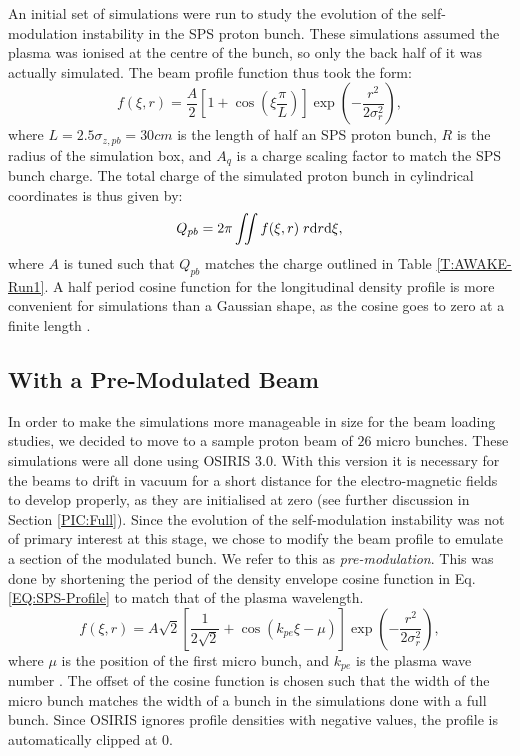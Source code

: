 An initial set of simulations were run to study the evolution of the self-modulation instability in the SPS proton bunch.
These simulations assumed the plasma was ionised at the centre of the bunch, so only the back half of it was actually simulated.
The beam profile function thus took the form:
\begin{equation}
    f(\xi,r) = \frac{A}{2} \left[1 + \cos\left(\xi\frac{\pi}{L}\right)\right] \exp\left(-\frac{r^{2}}{2\sigma_{r}^{2}}\right), \label{EQ:SPS-Profile}
\end{equation}
where $L = 2.5\sigma_{z,pb} = 30\unit{cm}$ is the length of half an SPS proton bunch, $R$ is the radius of the simulation box, and $A_{q}$ is a charge scaling factor to match the SPS bunch charge.
The total charge of the simulated proton bunch in cylindrical coordinates is thus given by:
\begin{equation}
    Q_{pb} = 2\pi \iint f(\xi,r) \;r \mathrm{d} r \mathrm{d} \xi, \label{EQ:SPS-Charge}
\end{equation}
where $A$ is tuned such that $Q_{pb}$ matches the charge outlined in Table \ref{T:AWAKE-Run1}.
A half period cosine function for the longitudinal density profile is more convenient for simulations than a Gaussian shape, as the cosine goes to zero at a finite length \cite{lotov:2010}.


\subsection{With a Pre-Modulated Beam}
\label{Sim:PBPreMod}

In order to make the simulations more manageable in size for the beam loading studies, we decided to move to a sample proton beam of $26$ micro bunches.
These simulations were all done using OSIRIS 3.0.
With this version it is necessary for the beams to drift in vacuum for a short distance for the electro-magnetic fields to develop properly, as they are initialised at zero (see further discussion in Section \ref{PIC:Full}).
Since the evolution of the self-modulation instability was not of primary interest at this stage, we chose to modify the beam profile to emulate a section of the modulated bunch.
We refer to this as \textit{pre-modulation}.
This was done by shortening the period of the density envelope cosine function in Eq. \ref{EQ:SPS-Profile} to match that of the plasma wavelength.
\begin{equation}
    f(\xi,r) = A\sqrt{2} \left[\frac{1}{2\sqrt{2}}
             + \cos\left(k_{pe}\xi - \mu\right)\right] \exp\left(-\frac{r^{2}}{2\sigma_{r}^{2}}\right), \label{EQ:PB-PreMod}
\end{equation}
where $\mu$ is the position of the first micro bunch, and $k_{pe}$ is the plasma wave number \cite{berglyd_olsen:2015}.
The offset of the cosine function is chosen such that the width of the micro bunch matches the width of a bunch in the simulations done with a full bunch.
Since OSIRIS ignores profile densities with negative values, the profile is automatically clipped at $0$.

